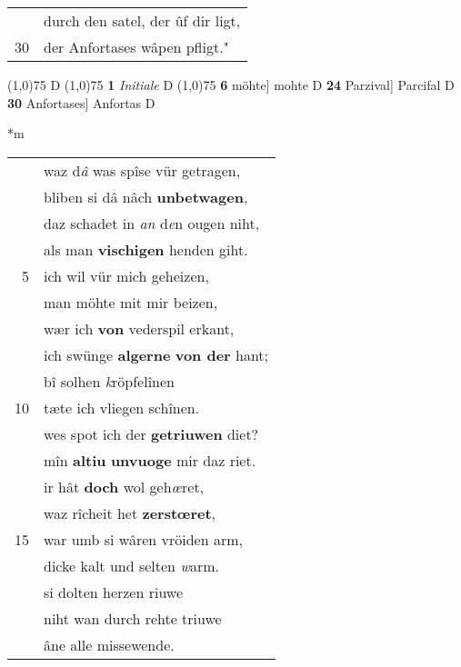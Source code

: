\documentclass[8pt,a4paper,notitlepage]{article}
\begin{document}
\begin{table}[ht]
\begin{minipage}[t]{0.5\linewidth}
\begin{tabular}{rl}
 & durch den satel, der ûf dir ligt,\\ 
30 & der Anfortases wâpen pfligt."\\ 
\end{tabular}
\scriptsize
\line(1,0){75} \newline
D \newline
\line(1,0){75} \newline
\textbf{1} \textit{Initiale} D  \newline
\line(1,0){75} \newline
\textbf{6} möhte] mohte D \textbf{24} Parzival] Parcifal D \textbf{30} Anfortases] Anfortas D \newline
\end{minipage}
\hspace{0.5cm}
\begin{minipage}[t]{0.5\linewidth}
\small
\begin{center}*m
\end{center}
\begin{tabular}{rl}
 & waz d\textit{â} was spîse vür getragen,\\ 
 & bliben si dâ nâch \textbf{unbetwagen},\\ 
 & daz schadet in \textit{an} d\textit{e}n ougen niht,\\ 
 & als man \textbf{vischigen} henden giht.\\ 
5 & ich wil vür mich geheizen,\\ 
 & man möhte mit mir beizen,\\ 
 & wær ich \textbf{von} vederspil erkant,\\ 
 & ich swünge \textbf{algerne} \textbf{von der} hant;\\ 
 & bî solhen \textit{k}röpfelînen\\ 
10 & tæte ich vliegen schînen.\\ 
 & wes spot ich der \textbf{getriuwen} diet?\\ 
 & mîn \textbf{altiu} \textbf{unvuoge} mir daz riet.\\ 
 & ir hât \textbf{doch} wol geh\textit{œ}ret,\\ 
 & waz rîcheit het \textbf{zerstœret},\\ 
15 & war umb si wâren vröiden arm,\\ 
 & dicke kalt und selten \textit{w}arm.\\ 
 & si dolten herzen riuwe\\ 
 & niht wan durch rehte triuwe\\ 
 & âne alle missewende.\\ 

\end{tabular}
\end{minipage}
\end{table}
\end{document}
